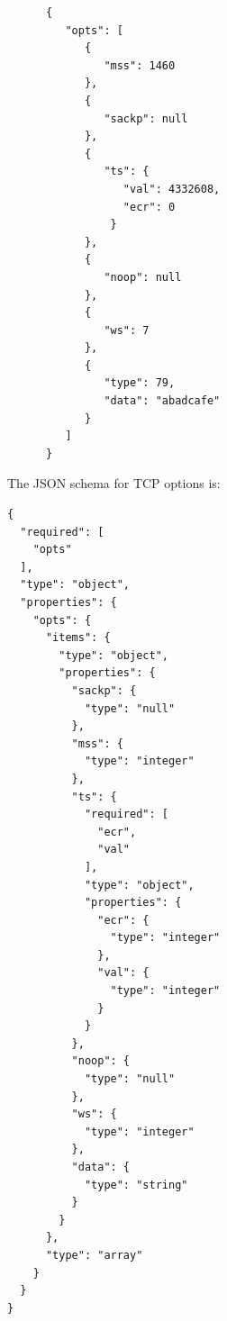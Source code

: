 \documentclass{book}
\begin{document}
\begin{minipage}{\textwidth}
\begin{verbatim} 
      {
         "opts": [
            {
               "mss": 1460
            }, 
            {
               "sackp": null 
            }, 
            {
               "ts": {
                  "val": 4332608, 
                  "ecr": 0
                }
            }, 
            {
               "noop": null
            }, 
            {
               "ws": 7
            },
            {
               "type": 79,
               "data": "abadcafe"
            }
         ]
      }
\end{verbatim} 
\end{minipage}

The JSON schema for TCP options is:

\begin{minipage}{\textwidth}
\begin{verbatim}
{
  "required": [
    "opts"
  ], 
  "type": "object", 
  "properties": {
    "opts": {
      "items": {
        "type": "object", 
        "properties": {
          "sackp": {
            "type": "null"
          }, 
          "mss": {
            "type": "integer"
          }, 
          "ts": {
            "required": [
              "ecr", 
              "val"
            ], 
            "type": "object", 
            "properties": {
              "ecr": {
                "type": "integer"
              }, 
              "val": {
                "type": "integer"
              }
            }
          }, 
          "noop": {
            "type": "null"
          }, 
          "ws": {
            "type": "integer"
          }, 
          "data": {
            "type": "string"
          }
        }
      }, 
      "type": "array"
    }
  }
}
\end{verbatim}
\end{minipage}
\end{document}

